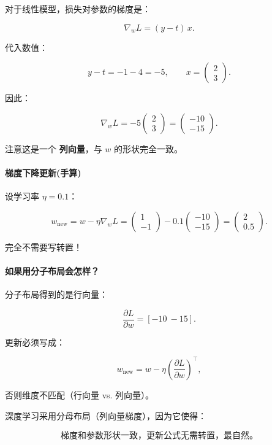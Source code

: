 对于线性模型，损失对参数的梯度是：

\[
\nabla_w L = (y - t)\, x.
\]

代入数值：

\[
y - t = -1 - 4 = -5,
\qquad
x = \begin{pmatrix}2 \\ 3\end{pmatrix}.
\]

因此：

\[
\nabla_w L
= -5
\begin{pmatrix}2 \\ 3\end{pmatrix}
=
\begin{pmatrix}-10 \\ -15\end{pmatrix}.
\]

注意这是一个 \textbf{列向量}，与 $w$ 的形状完全一致。

\paragraph{梯度下降更新(手算)}

设学习率 $\eta=0.1$：

\[
w_{\text{new}}
= w - \eta \nabla_w L
=
\begin{pmatrix}1 \\ -1\end{pmatrix}
- 0.1
\begin{pmatrix}-10 \\ -15\end{pmatrix}
=
\begin{pmatrix}2 \\ 0.5\end{pmatrix}.
\]

完全不需要写转置！

\paragraph{如果用分子布局会怎样？}

分子布局得到的是行向量：

\[
\frac{\partial L}{\partial w} = [-10\ -15].
\]

更新必须写成：

\[
w_{\text{new}} = w - \eta \left( \frac{\partial L}{\partial w} \right)^{\top},
\]

否则维度不匹配（行向量 vs. 列向量）。

\bigskip
\begin{tcolorbox}[title=结论, colback=yellow!10!white]
深度学习采用分母布局（列向量梯度），因为它使得：

\[
\boxed{ \text{梯度和参数形状一致，更新公式无需转置，最自然。} }
\]

\end{tcolorbox}




